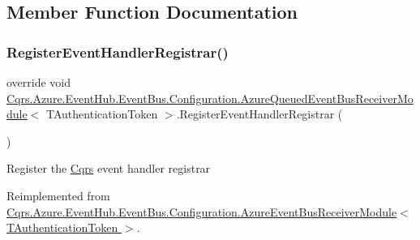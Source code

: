 \subsection{Member Function Documentation}
\mbox{\label{classCqrs_1_1Azure_1_1EventHub_1_1EventBus_1_1Configuration_1_1AzureQueuedEventBusReceiverModule_a419dbe60e08be1bbf29b875cb1f121d0}} 
\subsubsection{\texorpdfstring{Register\+Event\+Handler\+Registrar()}{RegisterEventHandlerRegistrar()}}
{\footnotesize\ttfamily override void \hyperlink{classCqrs_1_1Azure_1_1EventHub_1_1EventBus_1_1Configuration_1_1AzureQueuedEventBusReceiverModule}{Cqrs.\+Azure.\+Event\+Hub.\+Event\+Bus.\+Configuration.\+Azure\+Queued\+Event\+Bus\+Receiver\+Module}$<$ T\+Authentication\+Token $>$.Register\+Event\+Handler\+Registrar (\begin{DoxyParamCaption}{ }\end{DoxyParamCaption})\hspace{0.3cm}{\ttfamily [virtual]}}



Register the \hyperlink{namespaceCqrs}{Cqrs} event handler registrar 



Reimplemented from \hyperlink{classCqrs_1_1Azure_1_1EventHub_1_1EventBus_1_1Configuration_1_1AzureEventBusReceiverModule_ad170174fa51db720544ead9fcd74ecea}{Cqrs.\+Azure.\+Event\+Hub.\+Event\+Bus.\+Configuration.\+Azure\+Event\+Bus\+Receiver\+Module$<$ T\+Authentication\+Token $>$}.

